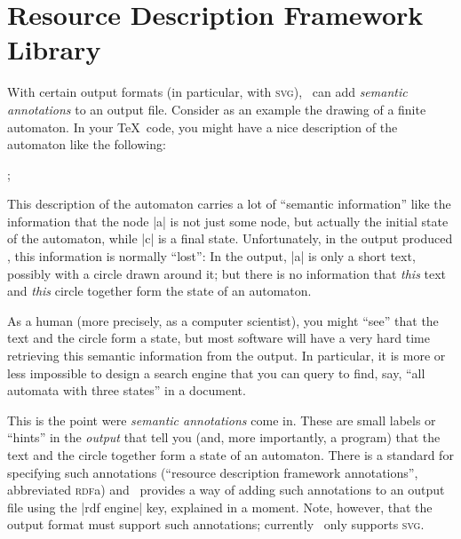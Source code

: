 %
%
%


\section{Resource Description Framework Library}
\label{section-library-rdf}
\label{section-tikz-rdf}

With  certain output
formats (in particular, with \textsc{svg}), \tikzname\ can add \emph{semantic
annotations} to an output file. Consider as an example the drawing of a finite
automaton. In your \TeX\ code, you might have a nice description of the
automaton like the following:
%
\begin{codeexample}
\tikz[automaton] ;
\end{codeexample}
%
This description of the automaton carries a lot of ``semantic information''
like the information that the node |a| is not just some node, but actually the
initial state of the automaton, while |c| is a final state. Unfortunately, in
the output produced \tikzname, this information is normally ``lost'': In the
output, |a| is only a short text, possibly with a circle drawn around it; but
there is no information that \emph{this} text and \emph{this} circle together
form the state of an automaton.

As a human (more precisely, as a computer scientist), you might ``see'' that
the text and the circle form a state, but most software will have a very hard
time retrieving this semantic information from the output. In particular, it is
more or less impossible to design a search engine that you can query to find,
say, ``all automata with three states'' in a document.

This is the point were \emph{semantic annotations} come in. These are small
labels or ``hints'' in the \emph{output} that tell you (and, more importantly,
a program) that the text and the circle together form a state of an automaton.
There is a standard for specifying such annotations (``resource description
framework annotations'', abbreviated \textsc{rdf}a) and \tikzname\ provides a
way of adding such annotations to an output file using the |rdf engine| key,
explained in a moment. Note, however, that the output format must support such
annotations; currently \tikzname\ only supports \textsc{svg}.


